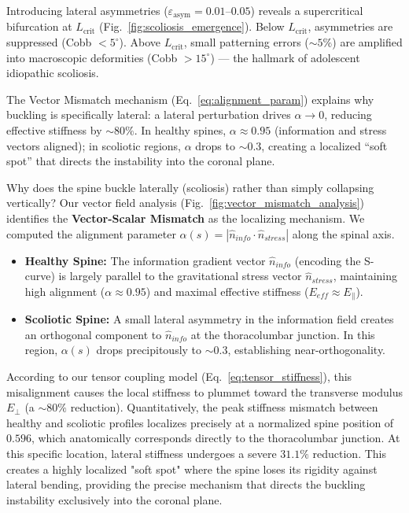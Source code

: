\documentclass[11pt]{article}
\begin{document}
Introducing lateral asymmetries ($\varepsilon_{\mathrm{asym}} = 0.01$--$0.05$) reveals a supercritical bifurcation at $L_{\mathrm{crit}}$ (Fig.~\ref{fig:scoliosis_emergence}). Below $L_{\mathrm{crit}}$, asymmetries are suppressed (Cobb $< 5^\circ$). Above $L_{\mathrm{crit}}$, small patterning errors (${\sim}5\%$) are amplified into macroscopic deformities (Cobb $> 15^\circ$) --- the hallmark of adolescent idiopathic scoliosis.

The Vector Mismatch mechanism (Eq.~\ref{eq:alignment_param}) explains why buckling is specifically lateral: a lateral perturbation drives $\alpha \to 0$, reducing effective stiffness by ${\sim}80\%$. In healthy spines, $\alpha \approx 0.95$ (information and stress vectors aligned); in scoliotic regions, $\alpha$ drops to ${\sim}0.3$, creating a localized ``soft spot'' that directs the instability into the coronal plane.


Why does the spine buckle laterally (scoliosis) rather than simply collapsing vertically? Our vector field analysis (Fig.~\ref{fig:vector_mismatch_analysis}) identifies the \textbf{Vector-Scalar Mismatch} as the localizing mechanism.
We computed the alignment parameter $\alpha(s) = |\hat{n}_{info} \cdot \hat{n}_{stress}|$ along the spinal axis.
\begin{itemize}
    \item \textbf{Healthy Spine:} The information gradient vector $\hat{n}_{info}$ (encoding the S-curve) is largely parallel to the gravitational stress vector $\hat{n}_{stress}$, maintaining high alignment ($\alpha \approx 0.95$) and maximal effective stiffness ($E_{eff} \approx E_{\parallel}$).
    \item \textbf{Scoliotic Spine:} A small lateral asymmetry in the information field creates an orthogonal component to $\hat{n}_{info}$ at the thoracolumbar junction. In this region, $\alpha(s)$ drops precipitously to $\sim 0.3$, establishing near-orthogonality.
\end{itemize}
According to our tensor coupling model (Eq.~\ref{eq:tensor_stiffness}), this misalignment causes the local stiffness to plummet toward the transverse modulus $E_{\perp}$ (a $\sim 80\%$ reduction). Quantitatively, the peak stiffness mismatch between healthy and scoliotic profiles localizes precisely at a normalized spine position of $0.596$, which anatomically corresponds directly to the thoracolumbar junction. At this specific location, lateral stiffness undergoes a severe $31.1\%$ reduction. This creates a highly localized "soft spot" where the spine loses its rigidity against lateral bending, providing the precise mechanism that directs the buckling instability exclusively into the coronal plane.
\end{document}
